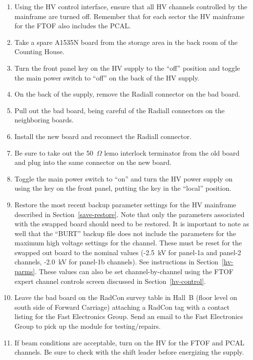 \documentclass[12pt]{article}
\begin{document}
\begin{enumerate}
\item Using the HV control interface, ensure that all HV channels controlled by the
mainframe are turned off. Remember that for each sector the HV mainframe for the FTOF
also includes the PCAL.
\item Take a spare A1535N board from the storage area in the back room of the Counting
House.
\item Turn the front panel key on the HV supply to the ``off'' position and toggle 
the main power switch to ``off'' on the back of the HV supply.
\item On the back of the supply, remove the Radiall connector on the bad board.
\item Pull out the bad board, being careful of the Radiall connectors on the neighboring 
boards.
\item Install the new board and reconnect the Radiall connector.
\item Be sure to take out the 50~$\Omega$ lemo interlock terminator from the old board 
and plug into the same connector on the new board.
\item Toggle the main power switch to ``on'' and turn the HV power supply on using the 
key on the front panel, putting the key in the ``local'' position.
\item Restore the most recent backup parameter settings for the HV mainframe described
in Section~\ref{save-restore}. Note that only the parameters associated with the swapped
board should need to be restored. It is important to note as well that the ``BURT'' backup
file does not include the parameters for the maximum high voltage settings for the channel.
These must be reset for the swapped out board to the nominal values (-2.5~kV for panel-1a
and panel-2 channels, -2.0~kV for panel-1b channels). See instructions in Section~\ref{hv-parms}.
These values can also be set channel-by-channel using the FTOF expert channel controls
screen discussed in Section~\ref{hv-control}.
\item Leave the bad board on the RadCon survey table in Hall~B (floor level on south side of
Forward Carriage) attaching a RadCon tag with a contact listing for the Fast Electronics Group.
Send an email to the Fast Electronics Group to pick up the module for testing/repairs.
\item If beam conditions are acceptable, turn on the HV for the FTOF and PCAL channels. 
Be sure to check with the shift leader before energizing the supply.
\end{enumerate}
\end{document}
